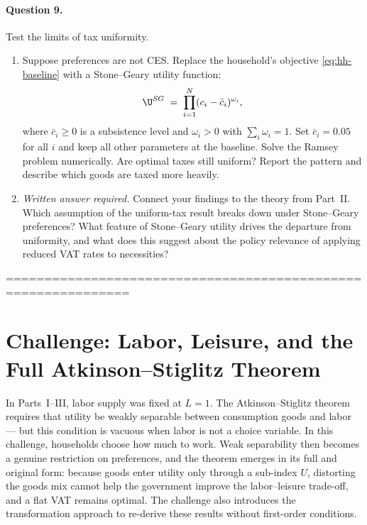 \paragraph{Question 9.}
Test the limits of tax uniformity.
 
\begin{enumerate}[label=(\alph*)]
    \item Suppose preferences are not CES. Replace the household's objective \eqref{eq:hh-baseline} with a Stone--Geary utility function:
    \[
        \U^{SG} \;=\; \prod_{i=1}^{N} (c_i - \bar{c}_i)^{\omega_i},
    \]
    where $\bar{c}_i \geq 0$ is a subsistence level and $\omega_i > 0$ with $\sum_i \omega_i = 1$. Set $\bar{c}_i = 0.05$ for all $i$ and keep all other parameters at the baseline. Solve the Ramsey problem numerically. Are optimal taxes still uniform? Report the pattern and describe which goods are taxed more heavily.
 
    \item \emph{Written answer required.} Connect your findings to the theory from Part~II. Which assumption of the uniform-tax result breaks down under Stone--Geary preferences? What feature of Stone--Geary utility drives the departure from uniformity, and what does this suggest about the policy relevance of applying reduced VAT rates to necessities?
\end{enumerate}
 
% 
\newpage
==============================================================
\section{Challenge: Labor, Leisure, and the Full Atkinson--Stiglitz Theorem}
\label{sec:challenge}
 
\begin{calloutnote}
In Parts~I--III, labor supply was fixed at $L = 1$. The Atkinson--Stiglitz theorem requires that utility be weakly separable between consumption goods and labor --- but this condition is vacuous when labor is not a choice variable. In this challenge, households choose how much to work. Weak separability then becomes a genuine restriction on preferences, and the theorem emerges in its full and original form: because goods enter utility only through a sub-index $U$, distorting the goods mix cannot help the government improve the labor--leisure trade-off, and a flat VAT remains optimal. The challenge also introduces the transformation approach to re-derive these results without first-order conditions.
\end{calloutnote}
 
